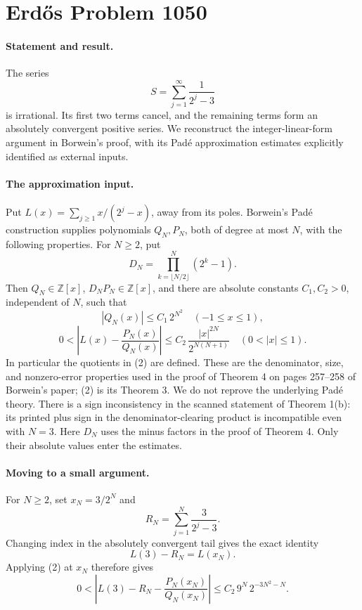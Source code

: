 \section*{Erd\H{o}s Problem 1050}

\paragraph{Statement and result.}
The series
\[
 S=\sum_{j=1}^{\infty}\frac1{2^j-3}
\]
is irrational. Its first two terms cancel, and the remaining terms form an absolutely convergent positive series. We reconstruct the integer-linear-form argument in Borwein's proof, with its Pad\'e approximation estimates explicitly identified as external inputs.

\paragraph{The approximation input.}
Put \(L(x)=\sum_{j\geq1}x/(2^j-x)\), away from its poles. Borwein's Pad\'e construction supplies polynomials \(Q_N,P_N\), both of degree at most \(N\), with the following properties. For \(N\geq2\), put
\[
 D_N=\prod_{k=\lfloor N/2\rfloor}^{N}(2^k-1).
\]
Then \(Q_N\in\mathbb Z[x]\), \(D_NP_N\in\mathbb Z[x]\), and there are absolute constants \(C_1,C_2>0\), independent of \(N\), such that
\[
 |Q_N(x)|\leq C_1\,2^{N^2}\quad(-1\leq x\leq1),
 \tag{1}
\]
\[
 0<\left|L(x)-\frac{P_N(x)}{Q_N(x)}\right|
 \leq C_2\,\frac{|x|^{2N}}{2^{N(N+1)}}
 \quad(0<|x|\leq1).
 \tag{2}
\]
In particular the quotients in (2) are defined. These are the denominator, size, and nonzero-error properties used in the proof of Theorem 4 on pages 257--258 of Borwein's paper; (2) is its Theorem 3. We do not reprove the underlying Pad\'e theory.
There is a sign inconsistency in the scanned statement of Theorem 1(b): its printed plus sign in the denominator-clearing product is incompatible even with \(N=3\). Here \(D_N\) uses the minus factors in the proof of Theorem 4. Only their absolute values enter the estimates.

\paragraph{Moving to a small argument.}
For \(N\geq2\), set \(x_N=3/2^N\) and
\[
 R_N=\sum_{j=1}^{N}\frac3{2^j-3}.
\]
Changing index in the absolutely convergent tail gives the exact identity
\[
 L(3)-R_N=L(x_N).
 \tag{3}
\]
Applying (2) at \(x_N\) therefore gives
\[
 0<
 \left|L(3)-R_N-\frac{P_N(x_N)}{Q_N(x_N)}\right|
 \leq C_2\,9^N\,2^{-3N^2-N}.
 \tag{4}
\]

